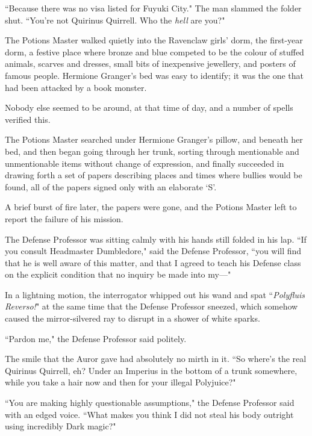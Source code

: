``Because there was no visa listed for Fuyuki City." The man slammed the folder shut. ``You're not Quirinus Quirrell. Who the \emph{hell} are you?"

\later

The Potions Master walked quietly into the Ravenclaw girls' dorm, the first-year dorm, a festive place where bronze and blue competed to be the colour of stuffed animals, scarves and dresses, small bits of inexpensive jewellery, and posters of famous people. Hermione Granger's bed was easy to identify; it was the one that had been attacked by a book monster.

Nobody else seemed to be around, at that time of day, and a number of spells verified this.

The Potions Master searched under Hermione Granger's pillow, and beneath her bed, and then began going through her trunk, sorting through mentionable and unmentionable items without change of expression, and finally succeeded in drawing forth a set of papers describing places and times where bullies would be found, all of the papers signed only with an elaborate `S'.

A brief burst of fire later, the papers were gone, and the Potions Master left to report the failure of his mission.

\later

The Defense Professor was sitting calmly with his hands still folded in his lap. ``If you consult Headmaster Dumbledore," said the Defense Professor, ``you will find that he is well aware of this matter, and that I agreed to teach his Defense class on the explicit condition that no inquiry be made into my—"

In a lightning motion, the interrogator whipped out his wand and spat ``\emph{Polyfluis Reverso!}" at the same time that the Defense Professor sneezed, which somehow caused the mirror-silvered ray to disrupt in a shower of white sparks.

``Pardon me," the Defense Professor said politely.

The smile that the Auror gave had absolutely no mirth in it. ``So where's the real Quirinus Quirrell, eh? Under an Imperius in the bottom of a trunk somewhere, while you take a hair now and then for your illegal Polyjuice?"

``You are making highly questionable assumptions," the Defense Professor said with an edged voice. ``What makes you think I did not steal his body outright using incredibly Dark magic?"

